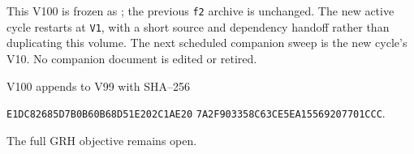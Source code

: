 \documentclass[11pt]{article}
\theoremstyle{definition}
\theoremstyle{remark}
\begin{document}
This V100 is frozen as
; the previous
\texttt{f2} archive is unchanged.  The new active cycle restarts at
\texttt{V1}, with a short source and dependency handoff rather than
duplicating this volume.  The next scheduled companion sweep is the
new cycle's V10.  No companion document is edited or retired.

V100 appends to V99 with SHA--256
\begin{center}
\texttt{E1DC82685D7B0B60B68D51E202C1AE20}\allowbreak
\texttt{7A2F903358C63CE5EA15569207701CCC}.
\end{center}
The full GRH objective remains open.
\endgroup
\end{document}
